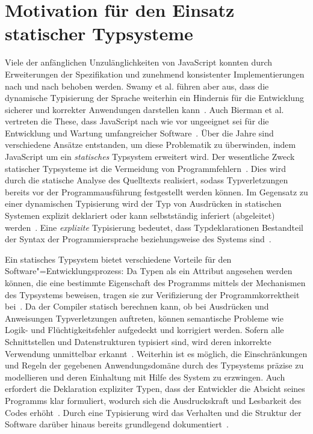 \section{Motivation für den Einsatz statischer Typsysteme}

Viele der anfänglichen Unzulänglichkeiten von JavaScript konnten durch Erweiterungen der Spezifikation und zunehmend konsistenter Implementierungen nach und nach behoben werden. Swamy et al. führen aber aus, dass die dynamische Typisierung der Sprache weiterhin ein Hindernis für die Entwicklung sicherer und korrekter Anwendungen darstellen kann~\autocite{NIKHIL:2014}. Auch Bierman et al. vertreten die These, dass JavaScript nach wie vor ungeeignet sei für die Entwicklung und Wartung umfangreicher Software~\autocite[1]{BIERMAN:2014}. Über die Jahre sind verschiedene Ansätze entstanden, um diese Problematik zu überwinden, indem JavaScript um ein \emph{statisches} Typsystem erweitert wird. Der wesentliche Zweck statischer Typsysteme ist die Vermeidung von Programmfehlern~\autocite[1]{CARDELLI:TYPE_SYSTEMS}. Dies wird durch die statische Analyse des Quelltexts realisiert, sodass Typverletzungen bereits vor der Programmausführung festgestellt werden können. Im Gegensatz zu einer dynamischen Typisierung wird der Typ von Ausdrücken in statischen Systemen explizit deklariert oder kann selbstständig inferiert (abgeleitet) werden~\autocite[45]{WALDMANN:PPS}. Eine \emph{explizite} Typisierung bedeutet, dass Typdeklarationen Bestandteil der Syntax der Programmiersprache beziehungsweise des Systems sind~\autocite[2]{CARDELLI:TYPE_SYSTEMS}.

Ein statisches Typsystem bietet verschiedene Vorteile für den Software"=Entwicklungsprozess: Da Typen als ein Attribut angesehen werden können, die eine bestimmte Eigenschaft des Programms mittels der Mechanismen des Typsystems beweisen, tragen sie zur Verifizierung der Programmkorrektheit bei~\autocite{SMITH:TYPE_SYSTEMS}. Da der Compiler statisch berechnen kann, ob bei Ausdrücken und Anweisungen Typverletzungen auftreten, können semantische Probleme wie Logik- und Flüchtigkeitsfehler aufgedeckt und korrigiert werden. Sofern alle Schnittstellen und Datenstrukturen typisiert sind, wird deren inkorrekte Verwendung unmittelbar erkannt~\autocite[6]{CARDELLI:TYPE_SYSTEMS}. Weiterhin ist es möglich, die Einschränkungen und Regeln der gegebenen Anwendungsdomäne durch des Typsystems präzise zu modellieren und deren Einhaltung mit Hilfe des System zu erzwingen. Auch erfordert die Deklaration expliziter Typen, dass der Entwickler die Absicht seines Programms klar formuliert, wodurch sich die Ausdruckskraft und Lesbarkeit des Codes erhöht~\autocite[96]{WALDMANN:PPS}. Durch eine Typisierung wird das Verhalten und die Struktur der Software darüber hinaus bereits grundlegend dokumentiert~\autocite[Abschn. 6.1.1]{MITCHELL:CONCEPTS}.

